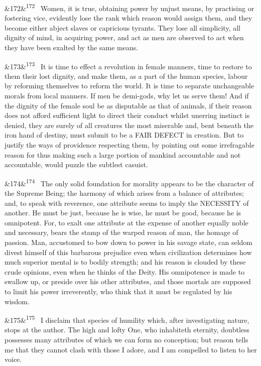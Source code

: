 \documentclass[12pt]{article}
\newcommand{\para}[1][]{\par\noindent\ifx&#1&\else\textsuperscript{\footnotesize #1}~\fi}
\begin{document}
\para[172] Women, it is true, obtaining power by unjust means, by practising or fostering vice, evidently lose the rank which reason would assign them, and they become either abject slaves or capricious tyrants. They lose all simplicity, all dignity of mind, in acquiring power, and act as men are observed to act when they have been exalted by the same means.

\para[173] It is time to effect a revolution in female manners, time to restore to them their lost dignity, and make them, as a part of the human species, labour by reforming themselves to reform the world. It is time to separate unchangeable morals from local manners. If men be demi-gods, why let us serve them! And if the dignity of the female soul be as disputable as that of animals, if their reason does not afford sufficient light to direct their conduct whilst unerring instinct is denied, they are surely of all creatures the most miserable and, bent beneath the iron hand of destiny, must submit to be a FAIR DEFECT in creation. But to justify the ways of providence respecting them, by pointing out some irrefragable reason for thus making such a large portion of mankind accountable and not accountable, would puzzle the subtlest casuist.

\para[174] The only solid foundation for morality appears to be the character of the Supreme Being; the harmony of which arises from a balance of attributes; and, to speak with reverence, one attribute seems to imply the NECESSITY of another. He must be just, because he is wise, he must be good, because he is omnipotent. For, to exalt one attribute at the expense of another equally noble and necessary, bears the stamp of the warped reason of man, the homage of passion. Man, accustomed to bow down to power in his savage state, can seldom divest himself of this barbarous prejudice even when civilization determines how much superior mental is to bodily strength; and his reason is clouded by these crude opinions, even when he thinks of the Deity. His omnipotence is made to swallow up, or preside over his other attributes, and those mortals are supposed to limit his power irreverently, who think that it must be regulated by his wisdom.

\para[175] I disclaim that species of humility which, after investigating nature, stops at the author. The high and lofty One, who inhabiteth eternity, doubtless possesses many attributes of which we can form no conception; but reason tells me that they cannot clash with those I adore, and I am compelled to listen to her voice.
\end{document}
